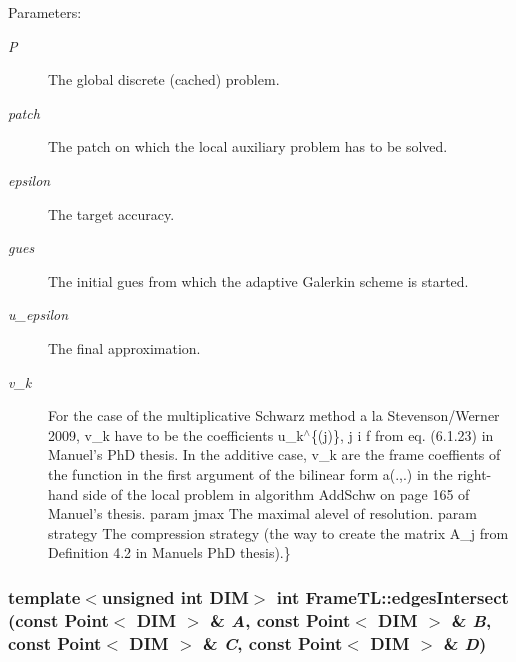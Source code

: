 \begin{Desc}
\item[Parameters:]
\begin{description}
\item[{\em P}]The global discrete (cached) problem. \item[{\em patch}]The patch on which the local auxiliary problem has to be solved. \item[{\em epsilon}]The target accuracy. \item[{\em gues}]The initial gues from which the adaptive Galerkin scheme is started. \item[{\em u\_\-epsilon}]The final approximation. \item[{\em v\_\-k}]For the case of the multiplicative Schwarz method a la Stevenson/Werner 2009, v\_\-k have to be the coefficients u\_\-k$^\wedge$\{(j)\}, j i f from eq. (6.1.23) in Manuel's PhD thesis. In the additive case, v\_\-k are the frame coeffients of the function in the first argument of the bilinear form a(.,.) in the right-hand side of the local problem in algorithm AddSchw on page 165 of Manuel's thesis. param jmax The maximal alevel of resolution. param strategy The compression strategy (the way to create the matrix A\_\-j from Definition 4.2 in Manuels PhD thesis).\} \end{description}
\end{Desc}
\hypertarget{namespaceFrameTL_179a53ae796b31d73b591456b7e8240e}{
\subsubsection[{edgesIntersect}]{\setlength{\rightskip}{0pt plus 5cm}template$<$unsigned int DIM$>$ int FrameTL::edgesIntersect (const Point$<$ DIM $>$ \& {\em A}, \/  const Point$<$ DIM $>$ \& {\em B}, \/  const Point$<$ DIM $>$ \& {\em C}, \/  const Point$<$ DIM $>$ \& {\em D})}}
\label{namespaceFrameTL_179a53ae796b31d73b591456b7e8240e}


